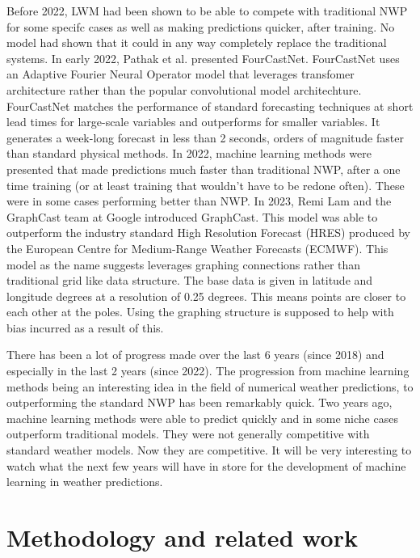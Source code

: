 Before 2022, LWM had been shown to be able to compete with traditional NWP for some specifc cases as well as making predictions quicker, after training. No model had shown that it could in any way completely replace the traditional systems. In early 2022, Pathak et al. presented FourCastNet. FourCastNet uses an Adaptive Fourier Neural Operator model that leverages transfomer architecture rather than the popular convolutional model architechture. FourCastNet matches the performance of standard forecasting techniques at short lead times for large-scale variables and outperforms for smaller variables. It generates a week-long forecast in less than 2 seconds, orders of magnitude faster than standard physical methods\cite{FourCastNet}. In 2022, machine learning methods were presented that made predictions much faster than traditional NWP, after a one time training (or at least training that wouldn't have to be redone often). These were in some cases performing better than NWP.  In 2023, Remi Lam and the GraphCast team at Google introduced GraphCast. This model was able to outperform the industry standard High Resolution Forecast (HRES) produced by the European Centre for Medium-Range Weather Forecasts (ECMWF). This model as the name suggests leverages graphing connections rather than traditional grid like data structure. The base data is given in latitude and longitude degrees at a resolution of 0.25 degrees. This means points are closer to each other at the poles. Using the graphing structure is supposed to help with bias incurred as a result of this\cite{GraphCast}.

There has been a lot of progress made over the last 6 years (since 2018) and especially in the last 2 years (since 2022). The progression from machine learning methods being an interesting idea in the field of numerical weather predictions, to outperforming the standard NWP has been remarkably quick. Two years ago, machine learning methods were able to predict quickly and in some niche cases outperform traditional models. They were not generally competitive with standard weather models. Now they are competitive. It will be very interesting to watch what the next few years will have in store for the development of machine learning in weather predictions.

\section{Methodology and related work}

